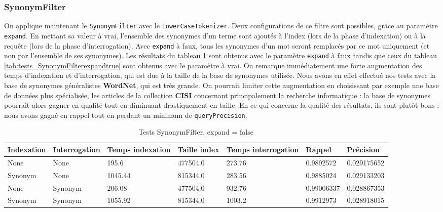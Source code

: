 \subsubsection{SynonymFilter}

On applique maintenant le \texttt{SynonymFilter} avec le \texttt{LowerCaseTokenizer}. Deux configurations de ce filtre sont possibles, grâce au paramètre \texttt{expand}. En mettant sa valeur à vrai, l'ensemble des synonymes d'un terme sont ajoutés à l'index (lors de la phase d'indexation) ou à la requête (lors de la phase d'interrogation). Avec \texttt{expand} à faux, tous les synonymes d'un mot seront remplacés par ce mot uniquement (et non par l'ensemble de ses synonymes). Les résultats du tableau \ref{tab:tests_SynonymFilterexpandfalse} sont obtenus avec le paramètre \texttt{expand} à faux tandis que ceux du tableau \ref{tab:tests_SynonymFilterexpandtrue} sont obtenus avec le paramètre à vrai. On remarque immédiatement une forte augmentation des temps d'indexation et d'interrogation, qui est due à la taille de la base de synonymes utilisée. Nous avons en effet effectué nos tests avec la base de synonymes généralistes \textbf{WordNet}, qui est très grande. On pourrait limiter cette augmentation en choisissant par exemple une base de données plus spécialisée, les articles de la collection \textbf{CISI} concernant principalement la recherche informatique : la base de synonymes pourrait alors gagner en qualité tout en diminuant drastiquement en taille. En ce qui concerne la qualité des résultats, ils sont plutôt bons : nous avons gagné en rappel tout en perdant un minimum de \texttt{queryPrecision}.

\begin{table}[!htbp]
    \hspace{-2cm}
                \begin{tabular}{|p{2.5cm}|p{2.5cm}|p{2cm}|p{2cm}|p{2.5cm}|p{2cm}|p{2cm}|}
                    \hline
                    \textbf{Indexation} & \textbf{Interrogation} & \textbf{Temps \mbox{indexation}} & \textbf{Taille \mbox{index}} & \textbf{Temps \mbox{interrogation}} & \textbf{Rappel} & \textbf{Précision}\\
                    \hline
                    None & None & 195.6 & 477504.0 & 273.76 & 0.9892572 & 0.029175652\\
                    \hline
Synonym & None & 1045.44 & 815344.0 & 283.56 & 0.9885024 & 0.029133203\\
		            \hline
None & Synonym & 206.08 & 477504.0 & 932.76 & 0.99006337 & 0.028867353\\
		            \hline
Synonym & Synonym & 1055.92 & 815344.0 & 1003.2 & 0.9912973 & 0.028918015\\
                    \hline
                \end{tabular}
                \caption{Tests SynonymFilter, expand = false}
                \label{tab:tests_SynonymFilterexpandfalse}
            \end{table}


